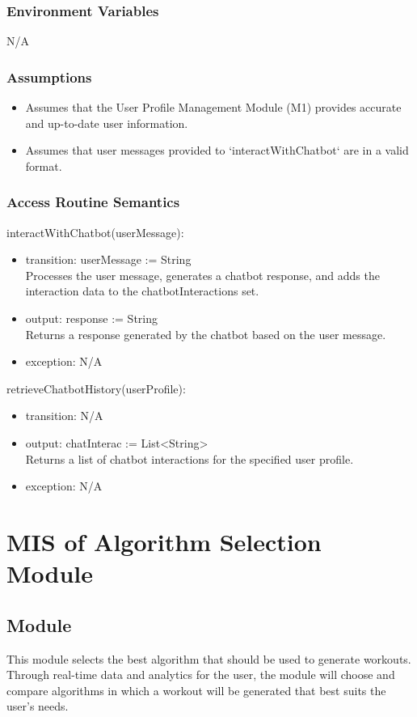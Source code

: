 \documentclass[12pt, titlepage]{article}
\begin{document}
\subsubsection{Environment Variables}
N/A

\subsubsection{Assumptions}
\begin{itemize}
\item Assumes that the User Profile Management Module (M1) provides accurate and up-to-date user information.
\item Assumes that user messages provided to `interactWithChatbot` are in a valid format.
\end{itemize}


\subsubsection{Access Routine Semantics}

\noindent interactWithChatbot(userMessage):
\begin{itemize}
\item transition: userMessage := String \\
Processes the user message, generates a chatbot response, and adds the interaction data to the chatbotInteractions set.
\item output: response := String\\
Returns a response generated by the chatbot based on the user message.
\item exception: N/A
\end{itemize}

\noindent retrieveChatbotHistory(userProfile):
\begin{itemize}
\item transition: N/A
\item output: chatInterac := List\textless String\textgreater \\
Returns a list of chatbot interactions for the specified user profile.
\item exception: N/A
\end{itemize}


\section{MIS of Algorithm Selection Module}


\subsection{Module}
This module selects the best algorithm that should be used to generate workouts. Through real-time data and analytics for the user, the module will choose and compare algorithms in which a workout will be generated that best suits the user's needs. 
\end{document}
